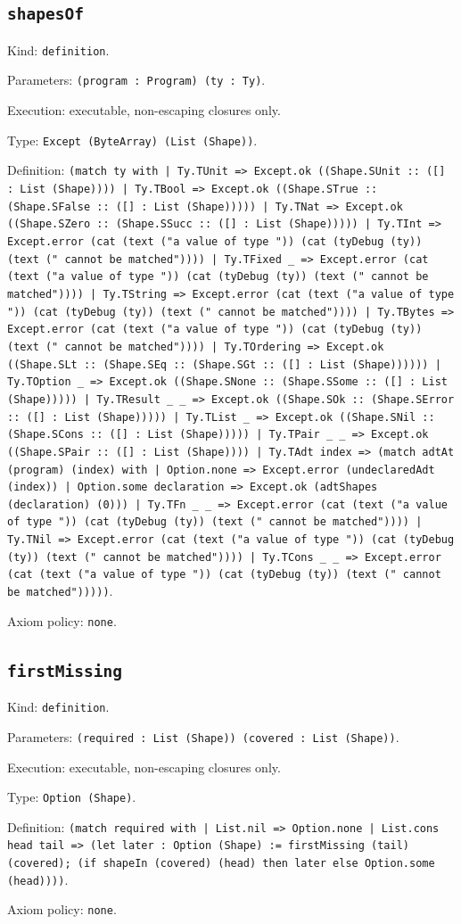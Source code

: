 \documentclass[11pt]{article}
\begin{document}
\subsection*{\texttt{shapesOf}}
\noindent Kind: \texttt{definition}.\par
\noindent Parameters: \texttt{(program : Program) (ty : Ty)}.\par
\noindent Execution: executable, non-escaping closures only.\par
\noindent Type: \texttt{Except (ByteArray) (List (Shape))}.\par
\noindent Definition: \texttt{(match ty with | Ty.TUnit => Except.ok ((Shape.SUnit :: ([] : List (Shape)))) | Ty.TBool => Except.ok ((Shape.STrue :: (Shape.SFalse :: ([] : List (Shape))))) | Ty.TNat => Except.ok ((Shape.SZero :: (Shape.SSucc :: ([] : List (Shape))))) | Ty.TInt => Except.error (cat (text ("a value of type ")) (cat (tyDebug (ty)) (text (" cannot be matched")))) | Ty.TFixed \_ => Except.error (cat (text ("a value of type ")) (cat (tyDebug (ty)) (text (" cannot be matched")))) | Ty.TString => Except.error (cat (text ("a value of type ")) (cat (tyDebug (ty)) (text (" cannot be matched")))) | Ty.TBytes => Except.error (cat (text ("a value of type ")) (cat (tyDebug (ty)) (text (" cannot be matched")))) | Ty.TOrdering => Except.ok ((Shape.SLt :: (Shape.SEq :: (Shape.SGt :: ([] : List (Shape)))))) | Ty.TOption \_ => Except.ok ((Shape.SNone :: (Shape.SSome :: ([] : List (Shape))))) | Ty.TResult \_ \_ => Except.ok ((Shape.SOk :: (Shape.SError :: ([] : List (Shape))))) | Ty.TList \_ => Except.ok ((Shape.SNil :: (Shape.SCons :: ([] : List (Shape))))) | Ty.TPair \_ \_ => Except.ok ((Shape.SPair :: ([] : List (Shape)))) | Ty.TAdt index => (match adtAt (program) (index) with | Option.none => Except.error (undeclaredAdt (index)) | Option.some declaration => Except.ok (adtShapes (declaration) (0))) | Ty.TFn \_ \_ => Except.error (cat (text ("a value of type ")) (cat (tyDebug (ty)) (text (" cannot be matched")))) | Ty.TNil => Except.error (cat (text ("a value of type ")) (cat (tyDebug (ty)) (text (" cannot be matched")))) | Ty.TCons \_ \_ => Except.error (cat (text ("a value of type ")) (cat (tyDebug (ty)) (text (" cannot be matched")))))}.\par
\noindent Axiom policy: \texttt{none}.\par
\subsection*{\texttt{firstMissing}}
\noindent Kind: \texttt{definition}.\par
\noindent Parameters: \texttt{(required : List (Shape)) (covered : List (Shape))}.\par
\noindent Execution: executable, non-escaping closures only.\par
\noindent Type: \texttt{Option (Shape)}.\par
\noindent Definition: \texttt{(match required with | List.nil => Option.none | List.cons head tail => (let later : Option (Shape) := firstMissing (tail) (covered); (if shapeIn (covered) (head) then later else Option.some (head))))}.\par
\noindent Axiom policy: \texttt{none}.\par
\end{document}
